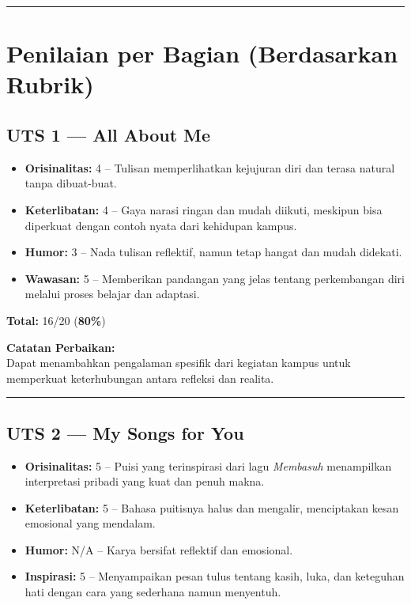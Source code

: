 \documentclass[
  letterpaper,
  DIV=11,
  numbers=noendperiod]{scrreprt}
\providecommand{\tightlist}{%
  \setlength{\itemsep}{0pt}\setlength{\parskip}{0pt}}
\begin{document}
\begin{center}\rule{0.5\linewidth}{0.5pt}\end{center}

\section{Penilaian per Bagian (Berdasarkan
Rubrik)}\label{penilaian-per-bagian-berdasarkan-rubrik}

\subsection{UTS 1 --- All About Me}\label{uts-1-all-about-me-1}

\begin{itemize}
\tightlist
\item
  \textbf{Orisinalitas:} 4 -- Tulisan memperlihatkan kejujuran diri dan
  terasa natural tanpa dibuat-buat.\\
\item
  \textbf{Keterlibatan:} 4 -- Gaya narasi ringan dan mudah diikuti,
  meskipun bisa diperkuat dengan contoh nyata dari kehidupan kampus.\\
\item
  \textbf{Humor:} 3 -- Nada tulisan reflektif, namun tetap hangat dan
  mudah didekati.\\
\item
  \textbf{Wawasan:} 5 -- Memberikan pandangan yang jelas tentang
  perkembangan diri melalui proses belajar dan adaptasi.
\end{itemize}

\textbf{Total:} 16/20 (\textbf{80\%})

\textbf{Catatan Perbaikan:}\\
Dapat menambahkan pengalaman spesifik dari kegiatan kampus untuk
memperkuat keterhubungan antara refleksi dan realita.

\begin{center}\rule{0.5\linewidth}{0.5pt}\end{center}

\subsection{UTS 2 --- My Songs for You}\label{uts-2-my-songs-for-you-1}

\begin{itemize}
\tightlist
\item
  \textbf{Orisinalitas:} 5 -- Puisi yang terinspirasi dari lagu
  \emph{Membasuh} menampilkan interpretasi pribadi yang kuat dan penuh
  makna.\\
\item
  \textbf{Keterlibatan:} 5 -- Bahasa puitisnya halus dan mengalir,
  menciptakan kesan emosional yang mendalam.\\
\item
  \textbf{Humor:} N/A -- Karya bersifat reflektif dan emosional.\\
\item
  \textbf{Inspirasi:} 5 -- Menyampaikan pesan tulus tentang kasih, luka,
  dan keteguhan hati dengan cara yang sederhana namun menyentuh.
\end{itemize}
\end{document}
